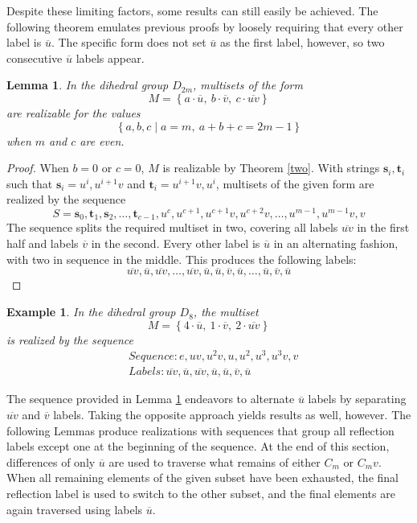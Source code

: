 \documentclass[12pt]{article}
\newtheorem{lem}[thm]{Lemma}
\newtheorem{exa}[thm]{Example}
\newcommand{\ba}{\[\begin{aligned}}
\newcommand{\ea}{\end{aligned}\]}
\newcommand{\setof}[1]{\left\{#1\right\}}
\newcommand{\setdef}[2]{\left\{#1\mid#2\right\}}
\newcommand{\ol}[1]{\overline{#1}} %
\newcommand{\bo}[1]{\textbf{#1}}%
\begin{document}
Despite these limiting factors, some results can still easily be achieved. The following
theorem emulates previous proofs by loosely requiring that every other label is $\ol{u}$.
The specific form does not set $\ol{u}$ as the first label, however, so two consecutive
$\ol{u}$ labels appear.

\begin{lem} \label{fixaceven} In the dihedral group $D_{2m}$, multisets of the form
$$M = \setof{a \cdot \ol{u},\ b \cdot \ol{v},\ c \cdot \ol{uv}}$$
are realizable for the values
$$\setdef{a, b, c}{a = m,\ a + b + c = 2m - 1}$$
when $m$ and $c$ are even.
\end{lem}
\begin{proof}
  When $b = 0$ or $c = 0$, $M$ is realizable by Theorem \ref{two}.
  With strings $\bo{s}_i, \bo{t}_i$ such that $\bo{s}_i = u^i, u^{i+1}v$ and
  $\bo{t}_i = u^{i+1}v, u^i$, multisets of the given form are realized by the sequence
  $$S = \bo{s}_0, \bo{t}_1, \bo{s}_2, \dots, \bo{t}_{c-1}, u^c, u^{c+1}, u^{c+1}v, u^{c+2}v, \dots, u^{m-1}, u^{m-1}v, v$$
  The sequence splits the required multiset in two, covering all labels $\ol{uv}$ in the first half and labels $\ol{v}$
  in the second. Every other label is $\ol{u}$ in an alternating fashion, with two in sequence in the middle.
  This produces the following labels:
  $$\ol{uv}, \ol{u}, \ol{uv}, \dots, \ol{uv}, \ol{u}, \ol{u}, \ol{v}, \ol{u}, \dots, \ol{u}, \ol{v}, \ol{u}$$
\end{proof}
\begin{exa}
  In the dihedral group $D_{8}$, the multiset
  $$M = \setof{4 \cdot \ol{u},\ 1 \cdot \ol{v},\ 2 \cdot \ol{uv}}$$
  is realized by the sequence
  \ba
  &Sequence : e, uv, u^2v, u, u^2, u^3, u^3v, v\\
  &Labels : \ol{uv}, \ol{u}, \ol{uv}, \ol{u}, \ol{u}, \ol{v}, \ol{u}
  \ea
\end{exa}

The sequence provided in Lemma \ref{fixaceven} endeavors to alternate $\ol{u}$ labels by
separating $\ol{uv}$ and $\ol{v}$ labels. Taking the opposite approach yields results as well,
however. The following Lemmas produce realizations with sequences that group all reflection
labels except one at the beginning of the sequence. At the end of this section, differences
of only $\ol{u}$ are used to traverse what remains of either $C_m$ or $C_mv$. When all
remaining elements of the given subset have been exhausted, the final reflection
label is used to switch to the other subset, and the final elements are again
traversed using labels $\ol{u}$.
\end{document}
